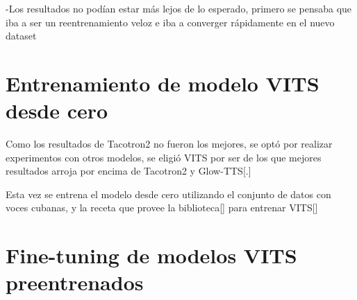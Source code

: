 -Los resultados no podían estar más lejos de lo esperado, primero se pensaba que iba a ser un reentrenamiento veloz e iba a converger rápidamente en el nuevo dataset 

\section{Entrenamiento de modelo VITS desde cero}
Como los resultados de Tacotron2 no fueron los mejores, se optó por realizar experimentos con otros modelos, se eligió VITS por ser de los que mejores resultados arroja por encima de Tacotron2 y Glow-TTS[\cite{kim2021conditional}.]

Esta vez se entrena el modelo desde cero utilizando el conjunto de datos con voces cubanas, y la receta que provee la biblioteca[\cite{coqui-doc}] para entrenar VITS[\cite{train-vits}]

\section{Fine-tuning de modelos VITS preentrenados}